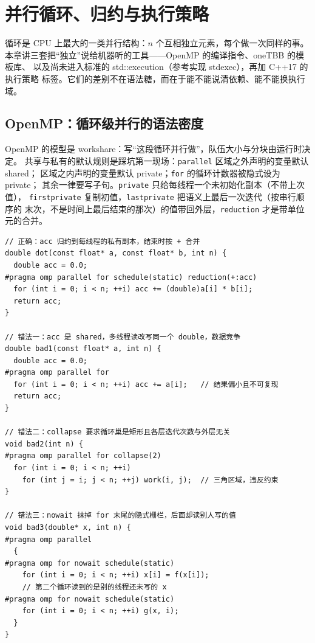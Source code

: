 \documentclass[12pt,a4paper,fontset=fandol]{ctexbook}
\newcommand{\cpp}[1]{C++#1}
\newcommand{\Tp}[1]{\texttt{#1}}
\begin{document}
\chapter{并行循环、归约与执行策略}

循环是 CPU 上最大的一类并行结构：$n$ 个互相独立元素，每个做一次同样的事。
本章讲三套把``独立''说给机器听的工具——OpenMP 的编译指令、oneTBB 的模板库、
以及尚未进入标准的 std::execution（参考实现 stdexec），再加 \cpp{17} 的执行策略
标签。它们的差别不在语法糖，而在于能不能说清依赖、能不能换执行域。

\section{OpenMP：循环级并行的语法密度}

OpenMP 的模型是 workshare：写``这段循环并行做''，队伍大小与分块由运行时决定。
共享与私有的默认规则是踩坑第一现场：\Tp{parallel} 区域之外声明的变量默认 shared；
区域之内声明的变量默认 private；\Tp{for} 的循环计数器被隐式设为 private；
其余一律要写子句。\Tp{private} 只给每线程一个未初始化副本（不带上次值），
\Tp{firstprivate} 复制初值，\Tp{lastprivate} 把语义上最后一次迭代（按串行顺序的
末次，不是时间上最后结束的那次）的值带回外层，\Tp{reduction} 才是带单位元的合并。

\begin{lstlisting}[style=cppstyle,caption={OpenMP reduction：正确写法与三种常见错法}]
// 正确：acc 归约到每线程的私有副本，结束时按 + 合并
double dot(const float* a, const float* b, int n) {
  double acc = 0.0;
#pragma omp parallel for schedule(static) reduction(+:acc)
  for (int i = 0; i < n; ++i) acc += (double)a[i] * b[i];
  return acc;
}

// 错法一：acc 是 shared，多线程读改写同一个 double，数据竞争
double bad1(const float* a, int n) {
  double acc = 0.0;
#pragma omp parallel for
  for (int i = 0; i < n; ++i) acc += a[i];   // 结果偏小且不可复现
  return acc;
}

// 错法二：collapse 要求循环巢是矩形且各层迭代次数与外层无关
void bad2(int n) {
#pragma omp parallel for collapse(2)
  for (int i = 0; i < n; ++i)
    for (int j = i; j < n; ++j) work(i, j);  // 三角区域，违反约束
}

// 错法三：nowait 抹掉 for 末尾的隐式栅栏，后面却读别人写的值
void bad3(double* x, int n) {
#pragma omp parallel
  {
#pragma omp for nowait schedule(static)
    for (int i = 0; i < n; ++i) x[i] = f(x[i]);
    // 第二个循环读到的是别的线程还未写的 x
#pragma omp for nowait schedule(static)
    for (int i = 0; i < n; ++i) g(x, i);
  }
}
\end{lstlisting}
\end{document}
